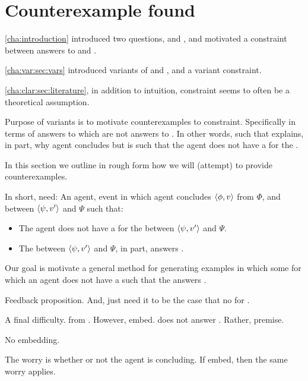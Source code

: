 \section{Counterexample found}
\label{sec:counterexample-found}

\begin{note}
  \autoref{cha:introduction} introduced two questions, \qWhy{} and \qHow{}, and motivated a constraint between answers to \qWhy{} and \qHow{}.

  \autoref{cha:var:sec:vars} introduced variants of \qWhy{} and \qHow{}, and a variant constraint.

  \autoref{cha:clar:sec:literature}, in addition to intuition, constraint seems to often be a theoretical assumption.

  Purpose of variants is to motivate counterexamples to constraint.
  Specifically in terms of answers to \qWhyV{} which are not answers to \qHowV{}.
  In other words, \ros{} such that \ros{} explains, in part, why agent concludes but is such that the agent does not have a \wit{} for the \ros{}.

  In this section we outline in rough form how we will (attempt) to provide counterexamples.

  In short, need:
  An agent, event in which agent concludes \(\langle \phi, v \rangle\) from \(\Phi\), and \ros{} between \(\langle \psi, v' \rangle\) and \(\Psi\) such that:

  \begin{itemize}
  \item
    The agent does not have a \wit{} for the \ros{} between \(\langle \psi, v' \rangle\) and \(\Psi\).
  \item
    The \ros{} between \(\langle \psi, v' \rangle\) and \(\Psi\), in part, answers \qWhyV{}.
  \end{itemize}

  Our goal is motivate a general method for generating examples in which some \ros{} for which an agent does not have a \wit{} such that the \ros{} answers \qWhyV{}.
\end{note}


\begin{note}
  Feedback proposition.
  And, just need it to be the case that no \wit{} for \fc{}.

  A final difficulty.
  \fc{} from \agpe{}.
  However, embed.
  \ros{} does not answer \qWhyV{}.
  Rather, premise.

  \begin{proposition}
    No embedding.
    \begin{argument}
      The worry is whether or not the agent is concluding.
      If embed, then the same worry applies.
    \end{argument}
  \end{proposition}
\end{note}

